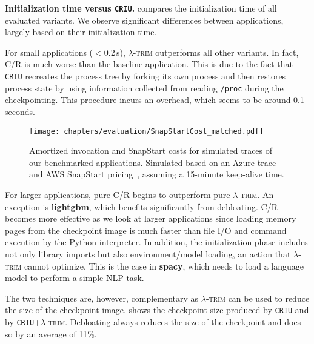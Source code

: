\documentclass[sigplan,screen]{acmart}
\newcommand{\sys}{\textsc{\ensuremath{\lambda}-trim}\xspace}
\newcommand{\heading}[1]{\vspace{4pt}\noindent\textbf{#1.}}
\newcommand{\application}[1]{{\textcolor{pennblue}{\textbf{#1}}}}
\begin{document}
\heading{Initialization time versus \texttt{CRIU}}
 compares the initialization time of all evaluated variants.
We observe significant differences between applications, largely based on their initialization time.

For small applications ($<$0.2\,s), \sys outperforms all other variants.
In fact, C/R is much worse than the baseline application.
This is due to the fact that \texttt{CRIU} recreates the process tree by forking its own process and then restores process state by using information collected from reading \texttt{/proc} during the checkpointing.
This procedure incurs an overhead, which seems to be around 0.1 seconds.

\begin{figure*}[t!]
  \centering
    
    \texttt{[image: chapters/evaluation/SnapStartCost\_matched.pdf]}

\vspace{-0.7em}
  \caption{Amortized invocation and SnapStart costs for simulated traces of our benchmarked applications.
Simulated based on an Azure trace~\cite{wild2020} and AWS SnapStart pricing~\cite{sspricing}, assuming a 15-minute keep-alive time.}
  \label{fig:snapstartcost}
\end{figure*}

For larger applications, pure C/R begins to outperform pure \sys.
An exception is \application{lightgbm}, which benefits significantly from debloating.
C/R becomes more effective as we look at larger applications 
since loading memory pages from the checkpoint image is much faster than file I/O and command execution by the Python interpreter.
In addition, the initialization phase includes not only library imports but also environment/model loading, an action that \sys cannot optimize.
This is the case in \application{spacy}, which needs to load a language model to perform a simple NLP task.










The two techniques are, however, complementary as \sys can be used to reduce the size of the checkpoint image.
 shows the checkpoint size produced by \texttt{CRIU} and by \texttt{CRIU}+\sys.
Debloating always reduces the size of the checkpoint and does so by an average of 11\%.
\end{document}
